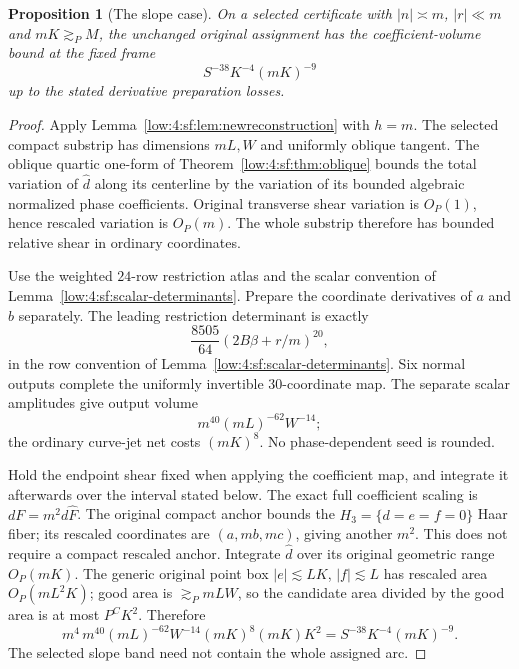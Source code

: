 \documentclass[11pt]{amsart}
\newtheorem{proposition}[theorem]{Proposition}
\theoremstyle{definition}
\theoremstyle{remark}
\numberwithin{equation}{section}
\begin{document}
\begin{proposition}[The slope case]\label{low:4:sf:prop:newslopecount}
On a selected certificate with $|n|\asymp m$, $|r|\ll m$ and $mK\gtrsim_PM$, the unchanged original assignment has the coefficient-volume bound at the fixed frame
\[
 \boxed{\quad S^{-38}K^{-4}(mK)^{-9}\quad}
\]
up to the stated derivative preparation losses.
\end{proposition}
\begin{proof}
Apply Lemma~\ref{low:4:sf:lem:newreconstruction} with $h=m$. The selected compact substrip has dimensions $mL,W$ and uniformly oblique tangent. The oblique quartic one-form of Theorem~\ref{low:4:sf:thm:oblique} bounds the total variation of $\widehat d$ along its centerline by the variation of its bounded algebraic normalized phase coefficients. Original transverse shear variation is $O_P(1)$, hence rescaled variation is $O_P(m)$. The whole substrip therefore has bounded relative shear in ordinary coordinates.

Use the weighted $24$-row restriction atlas and the scalar convention of Lemma~\ref{low:4:sf:scalar-determinants}. Prepare the coordinate derivatives of $a$ and $b$ separately. The leading restriction determinant is exactly
\[
 \frac{8505}{64}(2B\beta+r/m)^{20},
\]
in the row convention of Lemma~\ref{low:4:sf:scalar-determinants}. Six normal outputs complete the uniformly invertible $30$-coordinate map. The separate scalar amplitudes give output volume
\[
m^{40}(mL)^{-62}W^{-14};
\]
the ordinary curve-jet net costs $(mK)^8$. No phase-dependent seed is rounded.

Hold the endpoint shear fixed when applying the coefficient map, and integrate it afterwards over the interval stated below. The exact full coefficient scaling is $dF=m^2d\widehat F$. The original compact anchor bounds the $H_3=\{d=e=f=0\}$ Haar fiber; its rescaled coordinates are $(a,mb,mc)$, giving another $m^2$. This does not require a compact rescaled anchor. Integrate $\widehat d$ over its original geometric range $O_P(mK)$. The generic original point box $|e|\lesssim LK$, $|f|\lesssim L$ has rescaled area $O_P(mL^2K)$; good area is $\gtrsim_PmLW$, so the candidate area divided by the good area is at most $P^CK^2$. Therefore
\[
m^4\,m^{40}(mL)^{-62}W^{-14}(mK)^8(mK)K^2
 =S^{-38}K^{-4}(mK)^{-9}.
\]
The selected slope band need not contain the whole assigned arc.
\end{proof}
\end{document}
